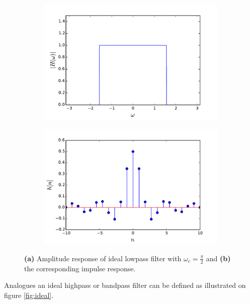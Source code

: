 \begin{figure}[H]
\begin{subfigure}[b]{0.50\textwidth}
        \centering
\includegraphics[scale=0.45]{figures/filter_teori/ideal_low2.pdf}
\caption{}
\end{subfigure}
\begin{subfigure}[b]{0.50\textwidth}
        \centering  
\includegraphics[scale=0.45]{figures/filter_teori/ideal_low1.pdf}
\caption{}
 \end{subfigure}
\caption{\textbf{(a)} Amplitude response of ideal lowpass filter with $\omega_c = \frac{\pi}{2}$ and \textbf{(b)} the corresponding impulse response.}
\label{fig:ideal_low}
\end{figure}

Analogues an ideal highpass or bandpass filter can be defined as illustrated on figure \ref{fig:ideal}.

